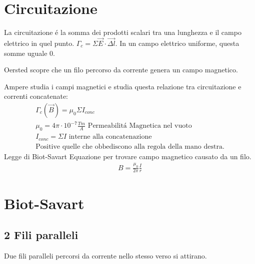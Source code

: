 \documentclass{article}
\begin{document}
\section{Circuitazione}
La circuitazione é la somma dei prodotti scalari tra una lunghezza e il campo elettrico in quel punto. $\Gamma_c=\Sigma \vec{E}\cdot \vec{\Delta l}$. In un campo elettrico uniforme, questa somme uguale 0.

Oersted scopre che un filo percorso da corrente genera un campo magnetico.

Ampere studia i campi magnetici e studia questa relazione tra circuitazione e correnti concatenate:
\begin{gather*}
     \Gamma_c(\vec{B})=\mu_0\Sigma I_{conc}\\
     \mu_0 = 4\pi \cdot 10^{-7}\frac{Tm}{A}\text{ Permeabilitá Magnetica nel vuoto}\\
     I_{conc} = \Sigma I \text{ interne alla concatenazione}\\  \text{Positive quelle che obbediscono alla regola della mano destra.}
\end{gather*}
Legge di Biot-Savart
Equazione per trovare campo magnetico causato da un filo.
\begin{gather*}
    B=\frac{\mu_0}{2\pi}\frac{I}{r}
\end{gather*}
\section*{Biot-Savart}
\subsection*{2 Fili paralleli}

Due fili paralleli percorsi da corrente nello stesso verso si attirano.
\end{document}

